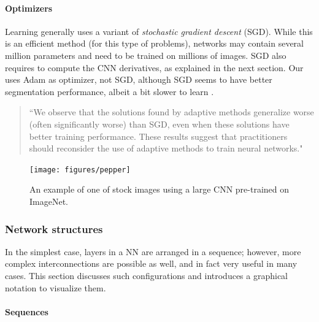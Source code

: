 \paragraph{Optimizers}\label{s:cnn-optimizers}

Learning generally uses a variant of \emph{stochastic gradient descent} (SGD). While this is an efficient method (for this type of problems), networks may contain several million parameters and need to be trained on millions of images. SGD also requires to compute the CNN derivatives, as explained in the next section. Our \maskrcnn uses Adam as optimizer, not SGD, although SGD seems to have better segmentation performance, albeit a bit slower to learn \cite{wilson2017marginal}.
\begin{quotation}“We observe that the solutions found by adaptive methods generalize worse (often significantly worse) than SGD, even when these solutions have better training performance. These results suggest that practitioners should reconsider the use of adaptive methods to train neural networks."
\end{quotation}

\begin{figure}[H]
	\centering
	\texttt{[image: figures/pepper]}
	\caption{An example of one of  \matlab stock images using a large CNN pre-trained on ImageNet.}
	\label{f:demo}
\end{figure}

\subsubsection{Network structures}\label{s:cnn-topology}

In the simplest case, layers in a NN are arranged in a sequence; however, more complex interconnections are possible as well, and in fact very useful in many cases. This section discusses such configurations and introduces a graphical notation to visualize them.

\paragraph{Sequences}\label{s:cnn-simple}

